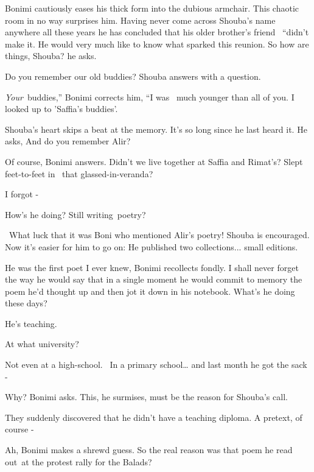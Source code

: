 \documentclass[12pt]{book}
\begin{document}
Bonimi cautiously eases his thick form into the dubious armchair. This chaotic room in no way surprises him. Having
never come across Shouba's name anywhere all these years he has concluded that his older brother's friend \ {}``didn't
make it{\textquotedbl}. He would very much like to know what sparked this reunion. {\textquotedbl}So how are things,
Shouba?{\textquotedbl} he asks.

{\textquotedbl}Do you remember our old buddies?{\textquotedbl} Shouba answers with a question.

{\textquotedbl}\textit{Your}~buddies,'' Bonimi corrects him, ``I was ~much younger than all of you. I looked up to
'Saffia's buddies'.{\textquotedbl}

Shouba's heart skips a beat at the memory. It's so long since he last heard it. He asks, {\textquotedbl}And do you
remember Alir?{\textquotedbl}

{\textquotedbl}Of course,{\textquotedbl} Bonimi answers. {\textquotedbl}Didn't we live together at Saffia and Rimat's?
Slept feet-to-feet in{~} that glassed-in-veranda?{\textquotedbl}

{\textquotedbl}I forgot -{\textquotedbl}

{\textquotedbl}How's he doing? Still writing~poetry?{\textquotedbl}

~What luck that it was Boni who mentioned Alir's poetry! Shouba is encouraged. Now it's easier for him to go on:
{\textquotedbl}He published two collections... small{ }editions.{\textquotedbl}

{\textquotedbl}He was the first poet I ever knew,{\textquotedbl} Bonimi recollects fondly. {\textquotedbl}I shall never
forget the way he would say that in a single moment he would commit to memory the poem he'd thought up and then jot it
down in his notebook. What's he doing these days?{\textquotedbl}

{\textquotedbl}He's teaching.{\textquotedbl}

{\textquotedbl}At what university?{\textquotedbl}

{\textquotedbl}Not even {at} a high-school.{ \ }{In a} primary
school{\dots} and last month he got the sack -{\textquotedbl}

{\textquotedbl}Why?{\textquotedbl} Bonimi asks. This, he surmises, must be the reason for Shouba's call.

{\textquotedbl}They suddenly discovered that he didn't have a teaching diploma. A pretext, of course -{\textquotedbl}

{\textquotedbl}Ah,{\textquotedbl} Bonimi makes a shrewd guess. {\textquotedbl}So the real reason was that poem he read
out~at the protest rally for the Balads?{\textquotedbl}
\end{document}
